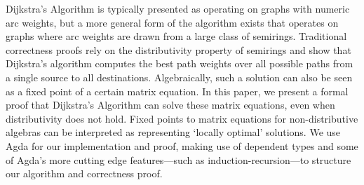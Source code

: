 Dijkstra's Algorithm is typically presented as operating on graphs with numeric arc weights, but a more general form of the algorithm exists that operates on graphs where arc weights are drawn from a large class of semirings.
Traditional correctness proofs rely on the distributivity property of semirings and show that Dijkstra's algorithm computes the best path weights over all possible paths from a single source to all destinations.
Algebraically, such a solution can also be seen as a fixed point of a certain matrix equation.
In this paper, we present a formal proof that Dijkstra's Algorithm can solve these matrix equations, even when distributivity does not hold.
Fixed points to matrix equations for non-distributive algebras can be interpreted as representing `locally optimal' solutions.
We use Agda for our implementation and proof, making use of dependent types and some of Agda's more cutting edge features---such as induction-recursion---to structure our algorithm and correctness proof.


